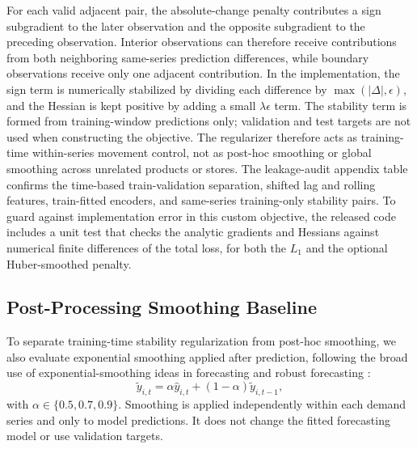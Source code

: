 \documentclass[10pt,conference]{IEEEtran}
\begin{document}
For each valid adjacent pair, the absolute-change penalty contributes a sign subgradient to the later observation and the opposite subgradient to the preceding observation. Interior observations can therefore receive contributions from both neighboring same-series prediction differences, while boundary observations receive only one adjacent contribution. In the implementation, the sign term is numerically stabilized by dividing each difference by $\max(|\Delta|,\epsilon)$, and the Hessian is kept positive by adding a small $\lambda\epsilon$ term. The stability term is formed from training-window predictions only; validation and test targets are not used when constructing the objective. The regularizer therefore acts as training-time within-series movement control, not as post-hoc smoothing or global smoothing across unrelated products or stores. The leakage-audit appendix table confirms the time-based train-validation separation, shifted lag and rolling features, train-fitted encoders, and same-series training-only stability pairs. To guard against implementation error in this custom objective, the released code includes a unit test that checks the analytic gradients and Hessians against numerical finite differences of the total loss, for both the $L_1$ and the optional Huber-smoothed penalty.

\subsection{Post-Processing Smoothing Baseline}
To separate training-time stability regularization from post-hoc smoothing, we also evaluate exponential smoothing applied after prediction, following the broad use of exponential-smoothing ideas in forecasting and robust forecasting \cite{barrow2020robustExponentialSmoothing,petropoulos2022forecasting}:
\begin{equation}
\tilde{y}_{i,t} = \alpha \hat{y}_{i,t} + (1-\alpha)\tilde{y}_{i,t-1},
\end{equation}
with $\alpha \in \{0.5,0.7,0.9\}$. Smoothing is applied independently within each demand series and only to model predictions. It does not change the fitted forecasting model or use validation targets.
\end{document}
